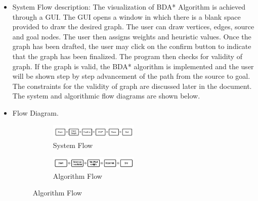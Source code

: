 \textnormal{
}


\begin{itemize} 
\item{  System Flow description:}  
\textnormal{The visualization of BDA* Algorithm is achieved through a GUI. The GUI opens a window in which there is a blank space provided to draw the desired graph. The user can draw vertices, edges, source and goal nodes. The user then assigns weights and heuristic values.  Once the graph has been drafted, the user may click on the confirm button to indicate that the graph has been finalized. The program then checks for validity of graph. If the graph is valid, the BDA* algorithm is implemented and the user will be shown step by step advancement of the path from the source to goal. The constraints for the validity of graph are discussed later in the document. The system and algorithmic flow diagrams are shown below.  }

\item{ Flow Diagram. }

    \begin{figure}[!h]
     \centering
      \begin{subfigure}{}
      
        \includegraphics[width=0.5\textwidth]{system.JPG}
        \caption{System Flow}
        \label{fig:1}
      \end{subfigure}
      \begin{subfigure}{}
        \includegraphics[width=0.5\textwidth]{algorithm.JPG}
        \caption{Algorithm Flow}
        \label{fig:2}
      \end{subfigure}
    \end{figure}


\end{itemize}

